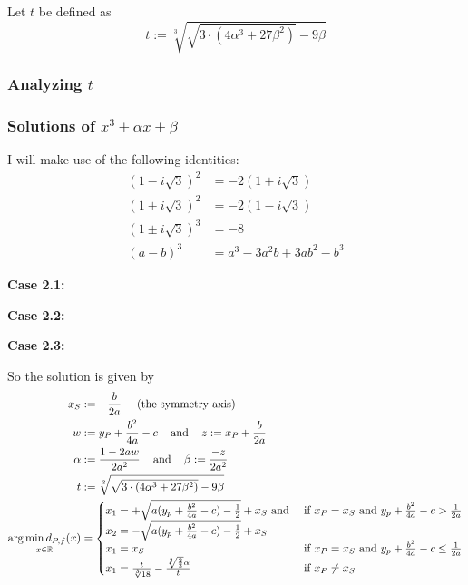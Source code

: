 Let $t$ be defined as
\[t := \sqrt[3]{\sqrt{3 \cdot (4 \alpha^3 + 27 \beta^2)} -9\beta}\]

\subsubsection{Analyzing $t$}


\subsubsection{Solutions of $x^3 + \alpha x + \beta$}
I will make use of the following identities:
\begin{align*}
    (1-i \sqrt{3})^2     &= -2 (1+i \sqrt{3})\\
    (1+i \sqrt{3})^2     &= -2 (1-i \sqrt{3})\\
    (1 \pm i \sqrt{3})^3 &= -8\\
    (a-b)^3              &= a^3-3 a^2 b+3 a b^2-b^3
\end{align*}

\textbf{Case 2.1:} 

\goodbreak
\textbf{Case 2.2:}


\textbf{Case 2.3:}


\goodbreak
So the solution is given by
\begin{align*}
x_S &:= - \frac{b}{2a} \;\;\;\;\; \text{(the symmetry axis)}\\
w &:= y_P+\frac{b^2}{4a}-c \;\;\; \text{ and } \;\;\; z := x_P+\frac{b}{2a}\\
\alpha &:= \frac{1- 2 aw}{2 a^2} \;\;\;\text{ and }\;\;\; \beta := \frac{-z}{2 a^2}\\
t &:= \sqrt[3]{\sqrt{3 \cdot (4 \alpha^3 + 27 \beta^2)} -9\beta}\\
\underset{x\in\mathbb{R}}{\arg \min d_{P,f}(x)} &= \begin{cases}
     x_1 = +\sqrt{a (y_p + \frac{b^2}{4a} - c) - \frac{1}{2}} + x_S \text{ and }   &\text{if } x_P = x_S \text{ and } y_p + \frac{b^2}{4a} - c >  \frac{1}{2a} \\
     x_2 = -\sqrt{a (y_p + \frac{b^2}{4a} - c) - \frac{1}{2}} + x_S\\
     x_1 = x_S   &\text{if } x_P = x_S \text{ and } y_p + \frac{b^2}{4a} - c \leq  \frac{1}{2a} \\
     x_1 = \frac{t}{\sqrt[3]{18}} - \frac{\sqrt[3]{\frac{2}{3}} \alpha }{t}   &\text{if } x_P \neq x_S
    \end{cases}
\end{align*}
\clearpage


